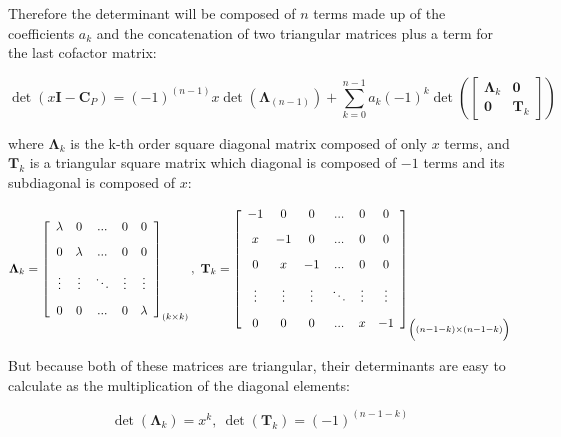 	Therefore the determinant will be composed of $n$ terms made up of the coefficients $a_k$ and the concatenation of two triangular matrices plus a term for the last cofactor matrix:

\begin{equation} \det\left(x \mathbf{I} - \mathbf{C}_P\right) = \left(-1\right)^{(n-1)}x\det\left(\mathbf{\Lambda}_{(n-1)}\right) + \sum\limits_{k=0}^{n-1} a_k \left(-1\right)^{k}\det\left(\left[\begin{array}{cc} \mathbf{\Lambda}_k & \mathbf{0} \\[3mm] \mathbf{0} & \mathbf{T}_k \end{array}\right]\right) \end{equation}

	\noindent where $\mathbf{\Lambda}_k$ is the k-th order square diagonal matrix composed of only $x$ terms, and $\mathbf{T}_k$ is a triangular square matrix which diagonal is composed of $-1$ terms and its subdiagonal is composed of $x$:

\begin{equation}
\mathbf{\Lambda}_k = \left[\begin{array}{cccccc} \lambda & 0 & ... & 0 & 0 \\[3mm] 0 & \lambda & ... & 0 & 0 \\[3mm] \vdots & \vdots & \ddots & \vdots & \vdots \\[3mm] 0 & 0 & ... & 0 & \lambda \end{array}\right]_{\left(k\times k\right)},\
%
\mathbf{T}_k = \left[\begin{array}{cccccc} -1 & 0 & 0 & ... & 0 & 0 \\[3mm] x & -1 & 0 & ... & 0 & 0  \\[3mm] 0 & x & -1 & ... & 0 & 0 \\[3mm] \vdots & \vdots & \vdots & \ddots & \vdots & \vdots \\[3mm] 0 & 0 & 0 & ... & x & -1 \end{array}\right]_{\left(\raisebox{3mm}{} \left(n-1-k\right)\times \left(n-1-k\right)\right)}
\end{equation}

	But because both of these matrices are triangular, their determinants are easy to calculate as the multiplication of the diagonal elements:

\begin{equation} \det\left(\mathbf{\Lambda}_k\right) = x^k ,\ \det\left(\mathbf{T}_k\right) = \left(-1\right)^{\left(n-1-k\right)} \end{equation}

